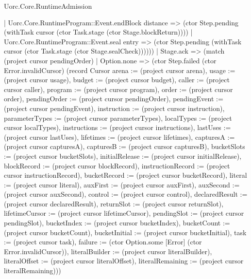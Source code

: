 \begin{lexlean}{Uorc.Core.RuntimeAdmission}
\begin{semanticmodule}
{          | Uorc.Core.RuntimeProgram::Event.endBlock distance => (ctor Step.pending (withTask cursor (ctor Task.stage (ctor Stage.blockReturn))))
          | Uorc.Core.RuntimeProgram::Event.seal entry => (ctor Step.pending (withTask cursor (ctor Task.stage (ctor Stage.sealCheck))))))
      | Stage.ack => (match (project cursor pendingOrder)
        | Option.none => (ctor Step.failed (ctor Error.invalidCursor) (record Cursor {arena := (project cursor arena), usage := (project cursor usage), budget := (project cursor budget), caller := (project cursor caller), program := (project cursor program), order := (project cursor order), pendingOrder := (project cursor pendingOrder), pendingEvent := (project cursor pendingEvent), instruction := (project cursor instruction), parameterTypes := (project cursor parameterTypes), localTypes := (project cursor localTypes), instructions := (project cursor instructions), lastUses := (project cursor lastUses), lifetimes := (project cursor lifetimes), capturesA := (project cursor capturesA), capturesB := (project cursor capturesB), bucketSlots := (project cursor bucketSlots), initialRelease := (project cursor initialRelease), blockRecord := (project cursor blockRecord), instructionRecord := (project cursor instructionRecord), bucketRecord := (project cursor bucketRecord), literal := (project cursor literal), auxFirst := (project cursor auxFirst), auxSecond := (project cursor auxSecond), control := (project cursor control), declaredResult := (project cursor declaredResult), returnSlot := (project cursor returnSlot), lifetimeCursor := (project cursor lifetimeCursor), pendingSlot := (project cursor pendingSlot), bucketIndex := (project cursor bucketIndex), bucketCount := (project cursor bucketCount), bucketInitial := (project cursor bucketInitial), task := (project cursor task), failure := (ctor Option.some [Error] (ctor Error.invalidCursor)), literalBuilder := (project cursor literalBuilder), literalOffset := (project cursor literalOffset), literalRemaining := (project cursor literalRemaining)}))
}
\end{semanticmodule}
\end{lexlean}
